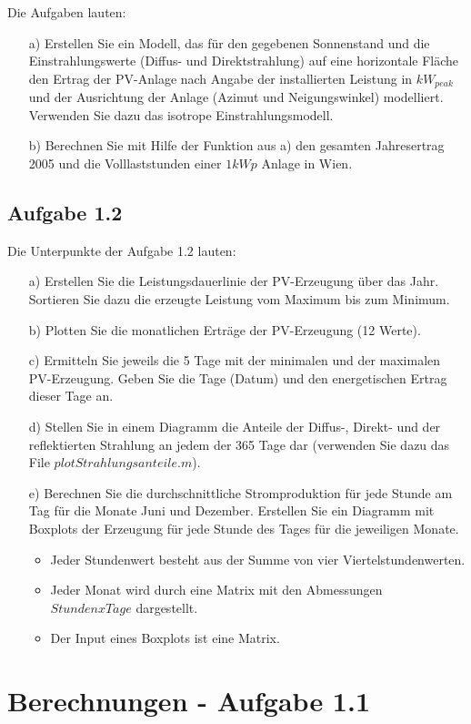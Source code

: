 \documentclass[a4paper,12pt]{article}
\begin{document}
	\newpage
	Die Aufgaben lauten:
	\begin{itemize}
		\item[a)] Erstellen Sie ein Modell, das für den gegebenen Sonnenstand und die Einstrahlungswerte (Diffus- und Direktstrahlung) auf eine horizontale Fläche den Ertrag der PV-Anlage nach Angabe der installierten Leistung in $kW_{peak}$ und der Ausrichtung der Anlage (Azimut und Neigungswinkel) modelliert. Verwenden Sie dazu das isotrope Einstrahlungsmodell.
		\item[b)] Berechnen Sie mit Hilfe der Funktion aus a) den gesamten Jahresertrag 2005 und die Volllaststunden einer $1kWp$ Anlage in Wien.
	\end{itemize}
	\subsection{Aufgabe 1.2}
	Die Unterpunkte der Aufgabe 1.2 lauten:
	\begin{itemize}
		\item[a)] Erstellen Sie die Leistungsdauerlinie der PV-Erzeugung über das Jahr. Sortieren Sie dazu die erzeugte Leistung vom Maximum bis zum Minimum.
		\item[b)] Plotten Sie die monatlichen Erträge der PV-Erzeugung (12 Werte).
		\item[c)] Ermitteln Sie jeweils die 5 Tage mit der minimalen und der maximalen PV-Erzeugung. Geben Sie die Tage (Datum) und den energetischen Ertrag dieser Tage an.
		\item[d)] Stellen Sie in einem Diagramm die Anteile der Diffus-, Direkt- und der reflektierten Strahlung an jedem der 365 Tage dar (verwenden Sie dazu das File $plotStrahlungsanteile.m$).
		\item[e)] Berechnen Sie die durchschnittliche Stromproduktion für jede Stunde am Tag für die Monate Juni und Dezember. Erstellen Sie ein Diagramm mit Boxplots der Erzeugung für jede Stunde des Tages für die jeweiligen Monate.
		\begin{itemize}
			\item Jeder Stundenwert besteht aus der Summe von vier Viertelstundenwerten.
			\item Jeder Monat wird durch eine Matrix mit den Abmessungen $Stunden x Tage$ dargestellt.
			\item Der Input eines Boxplots ist eine Matrix.
		\end{itemize}
	\end{itemize}
	\newpage
	\section{Berechnungen - Aufgabe 1.1}
\end{document}
